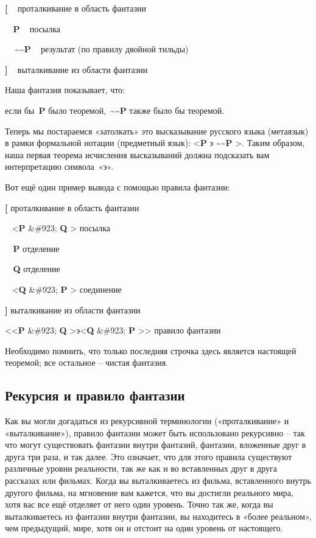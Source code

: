 \documentclass[../main.tex]{subfiles}
\begin{document}
\textbf{{[}} ~ проталкивание в область фантазии

\textbf{~ P} ~ посылка

\textbf{~~\textasciitilde\textasciitilde P} ~ результат (по правилу двойной тильды)

\textbf{{]}} ~ выталкивание из области фантазии

Наша фантазия показывает, что:

если бы~\textbf{P} было теоремой,~\textbf{\textasciitilde\textasciitilde P} также было бы теоремой.

Теперь мы постараемся «затолкать» это высказывание русского языка (метаязык) в рамки формальной нотации (предметный язык): \textless{}\textbf{P} э \textbf{\textasciitilde\textasciitilde P} \textgreater. Таким образом, наша первая теорема исчисления высказываний должна подсказать вам интерпретацию символа~«э».

Вот ещё один пример вывода с помощью правила фантазии:

\textbf{{[}} проталкивание в область фантазии

~ \textless{}\textbf{P} \&\#923; \textbf{Q} \textgreater{} посылка

\textbf{~ P} отделение

\textbf{~ Q} отделение

~ \textless{}\textbf{Q} \&\#923; \textbf{P} \textgreater{} соединение

\textbf{{]}} выталкивание из области фантазии

\textless\textless{}\textbf{P} \&\#923; \textbf{Q} \textgreater э\textless{}\textbf{Q} \&\#923; \textbf{P} \textgreater\textgreater{} правило фантазии

Необходимо помнить, что только последняя строчка здесь является настоящей теоремой; все остальное \--- чистая фантазия.


\subsection{Рекурсия и правило фантазии}

Как вы могли догадаться из рекурсивной терминологии («проталкивание» и «выталкивание»), правило фантазии может быть использовано рекурсивно \--- так что могут существовать фантазии внутри фантазий, фантазии, вложенные друг в друга три раза, и так далее. Это означает, что для этого правила существуют различные уровни реальности, так же как и во вставленных друг в друга рассказах или фильмах. Когда вы выталкиваетесь из фильма, вставленного внутрь другого фильма, на мгновение вам кажется, что вы достигли реального мира, хотя вас все ещё отделяет от него один уровень. Точно так же, когда вы выталкиваетесь из фантазии внутри фантазии, вы находитесь в «более реальном», чем предыдущий, мире, хотя он и отстоит на один уровень от настоящего.
\end{document}
